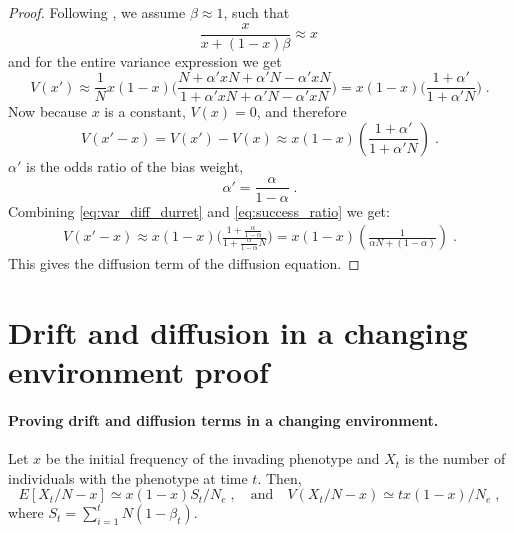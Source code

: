 \documentclass[12pt]{extarticle}
\begin{document}
\begin{proof}
Following \citet[ch~7.2]{durret}, we assume $\beta \approx 1$, such that
\begin{equation}
\frac{x}{x + (1-x)\beta} \approx x \,
\end{equation}
and for the entire variance expression we get
\begin{equation}
V(x') \approx  \frac{1}{N} x(1-x)
\Big(\frac{N + \alpha' xN + \alpha' N - \alpha' xN}{1 + \alpha' xN + \alpha' N - \alpha' xN}\Big)
= x(1-x)\Big(\frac{1 + \alpha'}{1 + \alpha' N}\Big) \;.
\end{equation}
Now because $x$ is a constant, $V(x) = 0$, and therefore
\begin{equation}\label{eq:var_diff_durret}
V(x'-x) = V(x') - V(x) \approx  x(1-x)(\frac{1 + \alpha'}{1 + \alpha' N}) \;.
\end{equation}
$\alpha'$ is the odds ratio of the bias weight, 
\begin{equation}\label{eq:success_ratio}
\alpha' = \frac{\alpha}{1-\alpha} \;.
\end{equation}
Combining \cref{eq:var_diff_durret} and \cref{eq:success_ratio} we get:
\begin{equation}\label{eq:const_var}
\begin{split}
V(x'-x) \approx x(1-x)\Big(\frac{1 + \frac{\alpha}{1-\alpha}}{1 + \frac{\alpha}{1-\alpha} N}\Big)
  = x(1-x)(\frac{1}{\alpha N + (1-\alpha)}) \;.
\end{split}
\end{equation}
This gives the diffusion term of the diffusion equation.
\end{proof}

\section{Drift and diffusion in a changing environment proof}\label{append:drift_diff_chang}
\paragraph{Proving drift and diffusion terms in a changing environment.}
Let $x$ be the initial frequency of the invading phenotype and $X_t$ is the number of individuals with the phenotype at time $t$.
Then,
\begin{equation*}
E[X_t/N - x] \simeq x(1-x) S_t / N_e \;, 
\quad
\text{and}
\quad
V(X_t/N-x) \simeq  t x(1-x) / N_e \;,
\end{equation*}
where $S_t=\sum\limits_{i=1}^{t} N (1-\beta_t)$.
\end{document}
